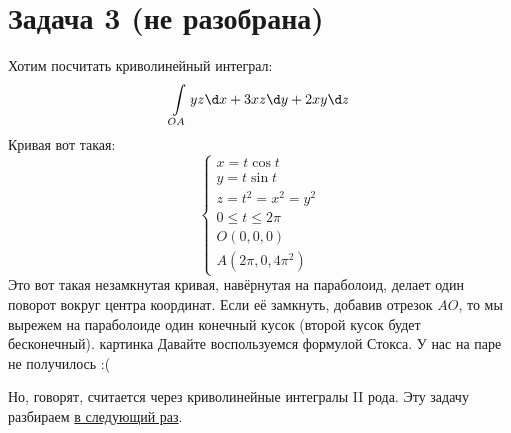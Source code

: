 \section{Задача 3 (не разобрана)}\label{day160218_task3}
	Хотим посчитать криволинейный интеграл:
	\[
		\int\limits_{OA} y z \d x + 3 x z \d y + 2 x y \d z \\
	\]
	Кривая вот такая:
	\[
		\begin{cases}
			x = t \cos t \\
			y = t \sin t \\
			z = t^2 = x^2=y^2 \\
			0 \le t \le 2 \pi \\
			O(0, 0, 0) \\
			A(2\pi, 0, 4\pi^2)
		\end{cases}
	\]
	Это вот такая незамкнутая кривая, навёрнутая на параболоид, делает один поворот вокруг центра координат.
	Если её замкнуть, добавив отрезок $AO$, то мы вырежем на параболоиде один конечный кусок (второй кусок будет бесконечный).
	\TODO картинка
	Давайте воспользуемся формулой Стокса.
	У нас на паре не получилось :(

	Но, говорят, считается через криволинейные интегралы II рода.
	Эту задачу разбираем \hyperref[day160225_task1]{в следующий раз}.
